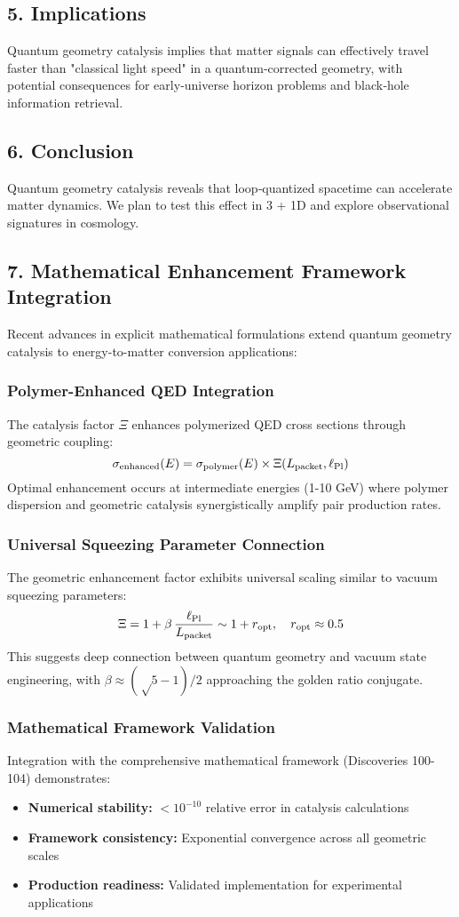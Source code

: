 \documentclass[12pt]{article}
\begin{document}
\subsection*{5. Implications}
Quantum geometry catalysis implies that matter signals can effectively travel faster than "classical light speed" in a quantum‐corrected geometry, with potential consequences for early‐universe horizon problems and black‐hole information retrieval.

\subsection*{6. Conclusion}
Quantum geometry catalysis reveals that loop‐quantized spacetime can accelerate matter dynamics.  We plan to test this effect in 3 + 1D and explore observational signatures in cosmology.

\subsection*{7. Mathematical Enhancement Framework Integration}
Recent advances in explicit mathematical formulations extend quantum geometry catalysis to energy-to-matter conversion applications:

\subsubsection*{Polymer-Enhanced QED Integration}
The catalysis factor $\Xi$ enhances polymerized QED cross sections through geometric coupling:
\[
  \sigma_{\rm enhanced}(E) = \sigma_{\rm polymer}(E) \times \Xi(L_{\rm packet}, \ell_{\rm Pl})
\]
Optimal enhancement occurs at intermediate energies (1-10 GeV) where polymer dispersion and geometric catalysis synergistically amplify pair production rates.

\subsubsection*{Universal Squeezing Parameter Connection}
The geometric enhancement factor exhibits universal scaling similar to vacuum squeezing parameters:
\[
  \Xi = 1 + \beta\,\frac{\ell_{\rm Pl}}{L_{\rm packet}} \sim 1 + r_{\rm opt}, \quad r_{\rm opt} \approx 0.5
\]
This suggests deep connection between quantum geometry and vacuum state engineering, with $\beta \approx (√5-1)/2$ approaching the golden ratio conjugate.

\subsubsection*{Mathematical Framework Validation}
Integration with the comprehensive mathematical framework (Discoveries 100-104) demonstrates:
\begin{itemize}
  \item \textbf{Numerical stability:} $<10^{-10}$ relative error in catalysis calculations
  \item \textbf{Framework consistency:} Exponential convergence across all geometric scales
  \item \textbf{Production readiness:} Validated implementation for experimental applications
\end{itemize}
\end{document}
